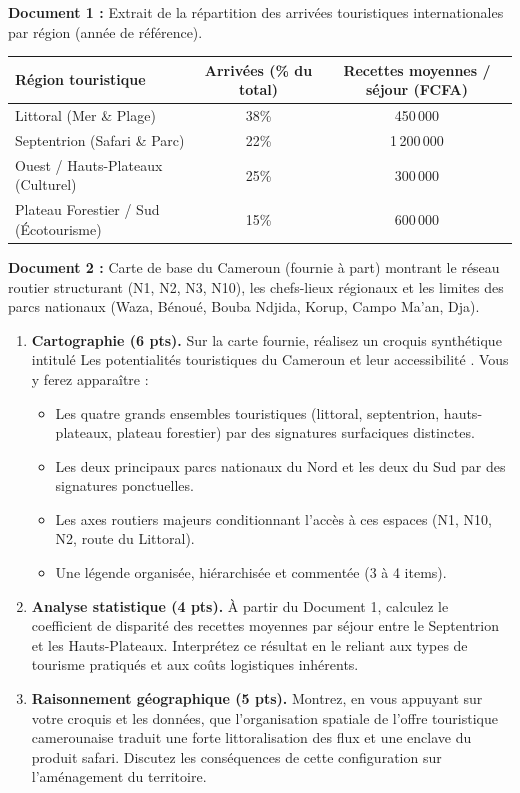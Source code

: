 \documentclass[11pt]{article}
\begin{document}
\begin{exercice}
\textbf{Document 1 :} Extrait de la répartition des arrivées touristiques internationales par région (année de référence).\\
\begin{tabular}{lcc}
\toprule
Région touristique & Arrivées (\% du total) & Recettes moyennes / séjour (FCFA) \\
\midrule
Littoral (Mer \& Plage) & 38\% & 450\,000 \\
Septentrion (Safari \& Parc) & 22\% & 1\,200\,000 \\
Ouest / Hauts-Plateaux (Culturel) & 25\% & 300\,000 \\
Plateau Forestier / Sud (Écotourisme) & 15\% & 600\,000 \\
\bottomrule
\end{tabular}

\textbf{Document 2 :} Carte de base du Cameroun (fournie à part) montrant le réseau routier structurant (N1, N2, N3, N10), les chefs-lieux régionaux et les limites des parcs nationaux (Waza, Bénoué, Bouba Ndjida, Korup, Campo Ma'an, Dja).

\begin{enumerate}
    \item \textbf{Cartographie (6 pts).} Sur la carte fournie, réalisez un croquis synthétique intitulé \og Les potentialités touristiques du Cameroun et leur accessibilité \fg. Vous y ferez apparaître :
    \begin{itemize}
        \item Les quatre grands ensembles touristiques (littoral, septentrion, hauts-plateaux, plateau forestier) par des signatures surfaciques distinctes.
        \item Les deux principaux parcs nationaux du Nord et les deux du Sud par des signatures ponctuelles.
        \item Les axes routiers majeurs conditionnant l'accès à ces espaces (N1, N10, N2, route du Littoral).
        \item Une légende organisée, hiérarchisée et commentée (3 à 4 items).
    \end{itemize}
    \item \textbf{Analyse statistique (4 pts).} À partir du Document 1, calculez le coefficient de disparité des recettes moyennes par séjour entre le Septentrion et les Hauts-Plateaux. Interprétez ce résultat en le reliant aux types de tourisme pratiqués et aux coûts logistiques inhérents.
    \item \textbf{Raisonnement géographique (5 pts).} Montrez, en vous appuyant sur votre croquis et les données, que l'organisation spatiale de l'offre touristique camerounaise traduit une forte \og littoralisation \fg des flux et une \og enclave \fg du produit safari. Discutez les conséquences de cette configuration sur l'aménagement du territoire.
\end{enumerate}
\end{exercice}
\end{document}
